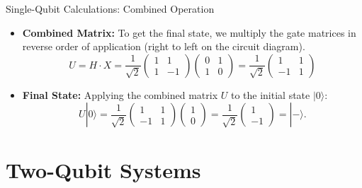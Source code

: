 \documentclass{beamer}
\begin{document}
\begin{frame}[fragile]{Single-Qubit Calculations: Combined Operation}
    \begin{itemize}
        \item \textbf{Combined Matrix:} To get the final state, we multiply the gate matrices in reverse order of application (right to left on the circuit diagram).
        \[ U = H \cdot X =  \frac{1}{\sqrt{2}} \begin{pmatrix} 1 & 1 \\ 1 & -1 \end{pmatrix} \begin{pmatrix} 0 & 1 \\ 1 & 0 \end{pmatrix} = \frac{1}{\sqrt{2}} \begin{pmatrix} 1 & 1 \\ -1 & 1 \end{pmatrix} \]
        \item \textbf{Final State:} Applying the combined matrix $U$ to the initial state $|0\rangle$:
        \[
        U |0\rangle = \frac{1}{\sqrt{2}} \begin{pmatrix} 1 & 1 \\ -1 & 1 \end{pmatrix} \begin{pmatrix} 1 \\ 0 \end{pmatrix} = \frac{1}{\sqrt{2}} \begin{pmatrix} 1 \\ -1 \end{pmatrix} = |-\rangle.
        \]
    \end{itemize}
\end{frame}

\section{Two-Qubit Systems}
\end{document}
